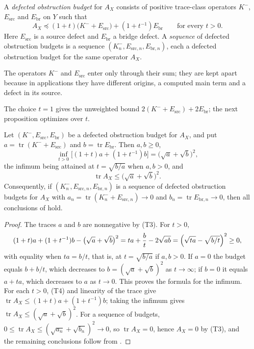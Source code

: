 \documentclass[11pt]{article}
\DeclareMathOperator{\trace}{tr}
\newcommand{\AX}{A_{X}}
\newcommand{\Kminus}{K^{-}}
\theoremstyle{definition}
\begin{document}
\begin{definition}
\label{def:duality_confinement:defected-budget}
A \emph{defected obstruction budget} for \(\AX\) consists of positive
trace-class operators \(\Kminus\), \(E_{\mathrm{src}}\) and
\(E_{\mathrm{br}}\) on \(Y\) such that
\[
  \AX
  \preceq
  (1+t)\bigl(\Kminus+E_{\mathrm{src}}\bigr)+(1+t^{-1})E_{\mathrm{br}}
  \qquad\text{for every }t>0 .
\]
Here \(E_{\mathrm{src}}\) is a source defect and \(E_{\mathrm{br}}\) a
bridge defect.  A \emph{sequence} of defected obstruction budgets is a
sequence \((\Kminus_n,E_{\mathrm{src},n},E_{\mathrm{br},n})\), each a
defected obstruction budget for the same operator \(\AX\).
\end{definition}

The operators \(\Kminus\) and \(E_{\mathrm{src}}\) enter only through
their sum; they are kept apart because in applications they have
different origins, a computed main term and a defect in its source.

The choice \(t=1\) gives the unweighted bound
\(2(\Kminus+E_{\mathrm{src}})+2E_{\mathrm{br}}\); the next proposition
optimizes over \(t\).

\begin{proposition}
\label{prop:duality_confinement:optimized-trace-budget}
Let \((\Kminus,E_{\mathrm{src}},E_{\mathrm{br}})\) be a defected
obstruction budget for \(\AX\), and put
\(a=\trace(\Kminus+E_{\mathrm{src}})\) and \(b=\trace E_{\mathrm{br}}\).
Then \(a,b\geq0\),
\[
  \inf_{t>0}\bigl[(1+t)a+(1+t^{-1})b\bigr]
  =\bigl(\sqrt a+\sqrt b\bigr)^2,
\]
the infimum being attained at \(t=\sqrt{b/a}\) when \(a,b>0\), and
\[
  \trace\AX\leq\bigl(\sqrt a+\sqrt b\bigr)^2 .
\]
Consequently, if \((\Kminus_n,E_{\mathrm{src},n},E_{\mathrm{br},n})\)
is a sequence of defected obstruction budgets for \(\AX\) with
\(a_n=\trace(\Kminus_n+E_{\mathrm{src},n})\to0\) and
\(b_n=\trace E_{\mathrm{br},n}\to0\), then all conclusions of
 hold.
\end{proposition}

\begin{proof}
The traces \(a\) and \(b\) are nonnegative by (T3).  For \(t>0\),
\[
  (1+t)a+(1+t^{-1})b-\bigl(\sqrt a+\sqrt b\bigr)^2
  =ta+\frac bt-2\sqrt{ab}
  =\Bigl(\sqrt{ta}-\sqrt{b/t}\Bigr)^2\geq0,
\]
with equality when \(ta=b/t\), that is, at \(t=\sqrt{b/a}\) if
\(a,b>0\).  If \(a=0\) the budget equals \(b+b/t\), which decreases to
\(b=(\sqrt a+\sqrt b)^2\) as \(t\to\infty\); if \(b=0\) it equals
\(a+ta\), which decreases to \(a\) as \(t\to0\).  This proves the
formula for the infimum.  For each \(t>0\), (T4) and linearity of the
trace give \(\trace\AX\leq(1+t)a+(1+t^{-1})b\); taking the infimum
gives \(\trace\AX\leq(\sqrt a+\sqrt b)^2\).  For a sequence of budgets,
\(0\leq\trace\AX\leq(\sqrt{a_n}+\sqrt{b_n})^2\to0\), so
\(\trace\AX=0\), hence \(\AX=0\) by (T3), and the remaining
conclusions follow from
.
\end{proof}
\end{document}
